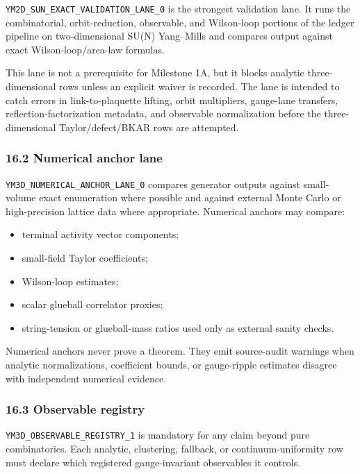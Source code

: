 \documentclass[
]{article}
\providecommand{\tightlist}{%
  \setlength{\itemsep}{0pt}\setlength{\parskip}{0pt}}
\begin{document}
\texttt{YM2D\_SUN\_EXACT\_VALIDATION\_LANE\_0} is the strongest
validation lane. It runs the combinatorial, orbit-reduction, observable,
and Wilson-loop portions of the ledger pipeline on two-dimensional SU(N)
Yang--Mills and compares output against exact Wilson-loop/area-law
formulas.

This lane is not a prerequisite for Milestone 1A, but it blocks analytic
three-dimensional rows unless an explicit waiver is recorded. The lane
is intended to catch errors in link-to-plaquette lifting, orbit
multipliers, gauge-lane transfers, reflection-factorization metadata,
and observable normalization before the three-dimensional
Taylor/defect/BKAR rows are attempted.

\subsubsection{16.2 Numerical anchor lane}\label{numerical-anchor-lane}

\texttt{YM3D\_NUMERICAL\_ANCHOR\_LANE\_0} compares generator outputs
against small-volume exact enumeration where possible and against
external Monte Carlo or high-precision lattice data where appropriate.
Numerical anchors may compare:

\begin{itemize}
\tightlist
\item
  terminal activity vector components;
\item
  small-field Taylor coefficients;
\item
  Wilson-loop estimates;
\item
  scalar glueball correlator proxies;
\item
  string-tension or glueball-mass ratios used only as external sanity
  checks.
\end{itemize}

Numerical anchors never prove a theorem. They emit source-audit warnings
when analytic normalizations, coefficient bounds, or gauge-ripple
estimates disagree with independent numerical evidence.

\subsubsection{16.3 Observable registry}\label{observable-registry}

\texttt{YM3D\_OBSERVABLE\_REGISTRY\_1} is mandatory for any claim beyond
pure combinatorics. Each analytic, clustering, fallback, or
continuum-uniformity row must declare which registered gauge-invariant
observables it controls.
\end{document}
